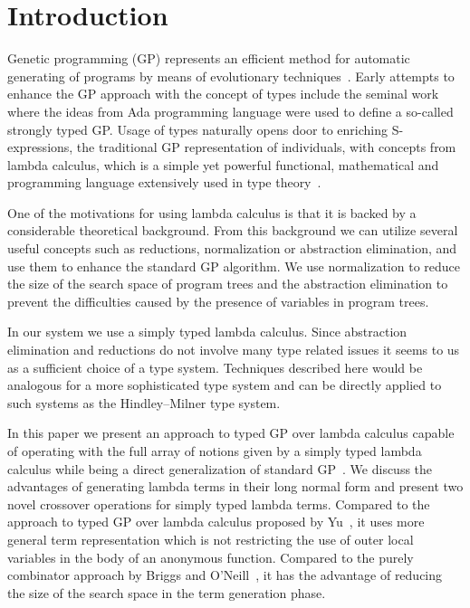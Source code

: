 \documentclass{sig-alternate}
\begin{document}


\section{Introduction}


Genetic programming (GP) represents an efficient method for automatic generating of programs by means of evolutionary techniques~\cite{koza92,koza03}. Early attempts to enhance the GP approach with the concept of types include the seminal work~\cite{montana95} where the ideas from Ada programming language were used to define a so-called strongly typed GP.   
Usage of types naturally opens door to enriching S-expressions,
the traditional GP representation of individuals, with concepts from
lambda calculus, which is a simple yet powerful functional, mathematical and programming language extensively used in type theory~\cite{yu01}. 

One of the motivations for using lambda calculus is that it is backed by a considerable theoretical background. From this background we can utilize several useful concepts such as reductions, normalization or abstraction elimination, and use them to enhance the standard GP algorithm. We use normalization to reduce the size of the search space of program trees and the abstraction elimination to prevent
the difficulties caused by the presence of variables in program trees.

In our system we use a simply typed lambda calculus. Since abstraction elimination and reductions do not involve many type related issues it seems to us as a sufficient choice of a type system. Techniques described here would be analogous for a more sophisticated type system and can be directly applied to such systems as the Hindley–Milner type system.


In this paper we present an approach to typed GP over lambda calculus capable of operating with the full array of notions given by a simply typed lambda calculus while being a direct generalization of standard GP~\cite{koza92}. We discuss the advantages of generating lambda terms in their long normal form and present two novel crossover operations for simply typed lambda terms. Compared to the approach to typed GP over lambda calculus  proposed by 
Yu~\cite{yu01}, it uses more general term representation which is not restricting the use of outer local variables in the body of an anonymous function. Compared to the purely combinator approach by Briggs and 
O’Neill~\cite{kes}, it has the advantage of reducing the size of the search space in the term generation phase.
\end{document}
